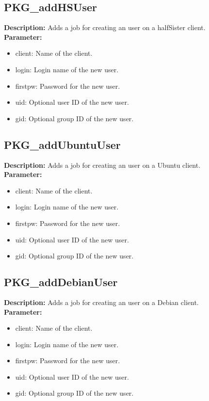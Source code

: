 \subsection{PKG\_addHSUser}
\textbf{Description:} Adds a job for creating an user on a halfSister client.\\
\textbf{Parameter:}
\begin{itemize}
\item client: Name of the client.
\item login: Login name of the new user.
\item firstpw: Password for the new user.
\item uid: Optional user ID of the new user.
\item gid: Optional group ID of the new user.
\end{itemize}

\subsection{PKG\_addUbuntuUser}
\textbf{Description:} Adds a job for creating an user on a Ubuntu client.\\
\textbf{Parameter:}
\begin{itemize}
\item client: Name of the client.
\item login: Login name of the new user.
\item firstpw: Password for the new user.
\item uid: Optional user ID of the new user.
\item gid: Optional group ID of the new user.
\end{itemize}

\subsection{PKG\_addDebianUser}
\textbf{Description:} Adds a job for creating an user on a Debian client.\\
\textbf{Parameter:}
\begin{itemize}
\item client: Name of the client.
\item login: Login name of the new user.
\item firstpw: Password for the new user.
\item uid: Optional user ID of the new user.
\item gid: Optional group ID of the new user.
\end{itemize}

